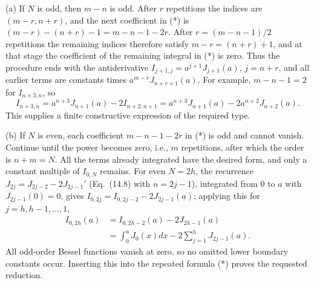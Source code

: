 (a) If $N$ is odd, then $m-n$ is odd. After $r$ repetitions the
indices are $(m-r,n+r)$, and the next coefficient in (*) is
$(m-r)-(n+r)-1=m-n-1-2r$. After $r=(m-n-1)/2$ repetitions the
remaining indices therefore satisfy $m-r=(n+r)+1$, and at that stage
the coefficient of the remaining integral in (*) is zero. Thus the
procedure ends with the antiderivative $I_{j+1,j}=a^{j+1}J_{j+1}(a)$,
$j=n+r$, and all earlier terms are constants times
$a^{m-r}J_{n+r+1}(a)$. For example, $m-n-1=2$ for $I_{n+3,n}$, so
\[
I_{n+3,n}=a^{n+3}J_{n+1}(a)-2I_{n+2,n+1}
=a^{n+3}J_{n+1}(a)-2a^{n+2}J_{n+2}(a).
\]
This supplies a finite constructive expression of the required type.

(b) If $N$ is even, each coefficient $m-n-1-2r$ in (*) is odd
and cannot vanish. Continue until the power becomes zero, i.e.,
$m$ repetitions, after which the order is $n+m=N$. All the
terms already integrated have the desired form, and only a constant
multiple of $I_{0,N}$ remains. For even $N=2h$, the recurrence
$J_{2j}=J_{2j-2}-2J_{2j-1}'$ (Eq.~(14.8) with $n=2j-1$), integrated
from $0$ to $a$ with $J_{2j-1}(0)=0$, gives
$I_{0,2j}=I_{0,2j-2}-2J_{2j-1}(a)$; applying this for
$j=h,h-1,\ldots,1$,
\begin{align*}
I_{0,2h}(a)
&=I_{0,2h-2}(a)-2J_{2h-1}(a)\\
&=\boxed{\int_0^a J_0(x)dx-2\sum_{j=1}^{h}J_{2j-1}(a)}.
\end{align*}
All odd-order Bessel functions vanish at zero, so no omitted lower
boundary constants occur. Inserting this into the repeated formula
(*) proves the requested reduction.

